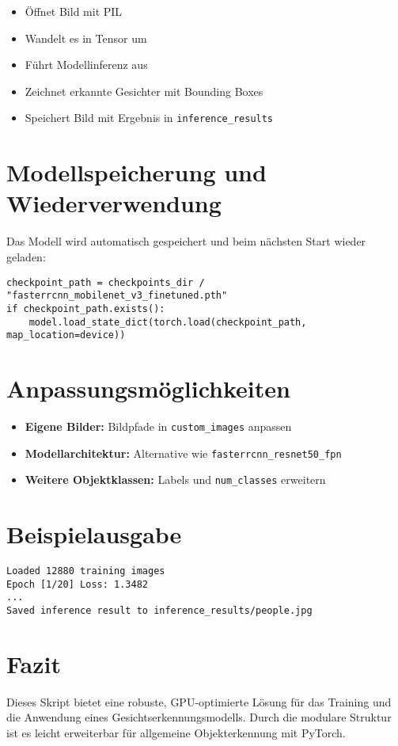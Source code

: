 \documentclass[11pt,a4paper]{article}
\begin{document}
\begin{itemize}
    \item Öffnet Bild mit PIL
    \item Wandelt es in Tensor um
    \item Führt Modellinferenz aus
    \item Zeichnet erkannte Gesichter mit Bounding Boxes
    \item Speichert Bild mit Ergebnis in \texttt{inference\_results}
\end{itemize}

\section{Modellspeicherung und Wiederverwendung}

Das Modell wird automatisch gespeichert und beim nächsten Start wieder geladen:

\begin{lstlisting}
checkpoint_path = checkpoints_dir / "fasterrcnn_mobilenet_v3_finetuned.pth"
if checkpoint_path.exists():
    model.load_state_dict(torch.load(checkpoint_path, map_location=device))
\end{lstlisting}

\section{Anpassungsmöglichkeiten}

\begin{itemize}
    \item \textbf{Eigene Bilder:} Bildpfade in \texttt{custom\_images} anpassen
    \item \textbf{Modellarchitektur:} Alternative wie \texttt{fasterrcnn\_resnet50\_fpn}
    \item \textbf{Weitere Objektklassen:} Labels und \texttt{num\_classes} erweitern
\end{itemize}

\section{Beispielausgabe}

\begin{verbatim}
Loaded 12880 training images
Epoch [1/20] Loss: 1.3482
...
Saved inference result to inference_results/people.jpg
\end{verbatim}

\section{Fazit}

Dieses Skript bietet eine robuste, GPU-optimierte Lösung für das Training und die Anwendung eines Gesichtserkennungsmodells. Durch die modulare Struktur ist es leicht erweiterbar für allgemeine Objekterkennung mit PyTorch.
\end{document}
